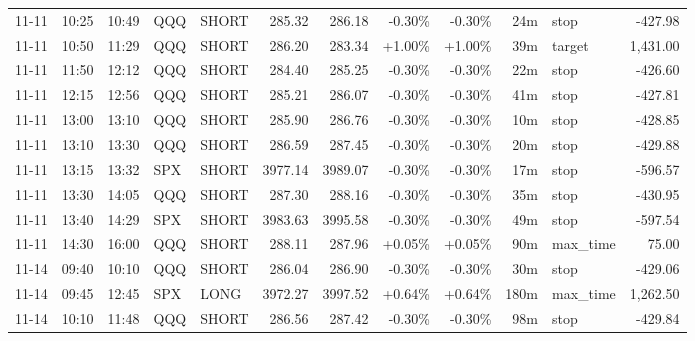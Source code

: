 \documentclass[11pt,a4paper,twoside]{article}
\begin{document}
\begin{center}
\begin{longtable}{>{\color{txtmain}}l l l l l r r r r r >{\color{txtmain}}l r}
11-11 & 10:25 & 10:49 & QQQ & SHORT & 285.32 & 286.18 & \textcolor{lossred}{-0.30\%} & \textcolor{lossred}{-0.30\%} & 24m & stop & \textcolor{lossred}{-427.98} \\
11-11 & 10:50 & 11:29 & QQQ & SHORT & 286.20 & 283.34 & \textcolor{wingreen}{+1.00\%} & \textcolor{wingreen}{+1.00\%} & 39m & target & \textcolor{wingreen}{1,431.00} \\
11-11 & 11:50 & 12:12 & QQQ & SHORT & 284.40 & 285.25 & \textcolor{lossred}{-0.30\%} & \textcolor{lossred}{-0.30\%} & 22m & stop & \textcolor{lossred}{-426.60} \\
11-11 & 12:15 & 12:56 & QQQ & SHORT & 285.21 & 286.07 & \textcolor{lossred}{-0.30\%} & \textcolor{lossred}{-0.30\%} & 41m & stop & \textcolor{lossred}{-427.81} \\
11-11 & 13:00 & 13:10 & QQQ & SHORT & 285.90 & 286.76 & \textcolor{lossred}{-0.30\%} & \textcolor{lossred}{-0.30\%} & 10m & stop & \textcolor{lossred}{-428.85} \\
11-11 & 13:10 & 13:30 & QQQ & SHORT & 286.59 & 287.45 & \textcolor{lossred}{-0.30\%} & \textcolor{lossred}{-0.30\%} & 20m & stop & \textcolor{lossred}{-429.88} \\
11-11 & 13:15 & 13:32 & SPX & SHORT & 3977.14 & 3989.07 & \textcolor{lossred}{-0.30\%} & \textcolor{lossred}{-0.30\%} & 17m & stop & \textcolor{lossred}{-596.57} \\
11-11 & 13:30 & 14:05 & QQQ & SHORT & 287.30 & 288.16 & \textcolor{lossred}{-0.30\%} & \textcolor{lossred}{-0.30\%} & 35m & stop & \textcolor{lossred}{-430.95} \\
11-11 & 13:40 & 14:29 & SPX & SHORT & 3983.63 & 3995.58 & \textcolor{lossred}{-0.30\%} & \textcolor{lossred}{-0.30\%} & 49m & stop & \textcolor{lossred}{-597.54} \\
11-11 & 14:30 & 16:00 & QQQ & SHORT & 288.11 & 287.96 & \textcolor{wingreen}{+0.05\%} & \textcolor{wingreen}{+0.05\%} & 90m & max\_time & \textcolor{wingreen}{75.00} \\
11-14 & 09:40 & 10:10 & QQQ & SHORT & 286.04 & 286.90 & \textcolor{lossred}{-0.30\%} & \textcolor{lossred}{-0.30\%} & 30m & stop & \textcolor{lossred}{-429.06} \\
11-14 & 09:45 & 12:45 & SPX & LONG & 3972.27 & 3997.52 & \textcolor{wingreen}{+0.64\%} & \textcolor{wingreen}{+0.64\%} & 180m & max\_time & \textcolor{wingreen}{1,262.50} \\
11-14 & 10:10 & 11:48 & QQQ & SHORT & 286.56 & 287.42 & \textcolor{lossred}{-0.30\%} & \textcolor{lossred}{-0.30\%} & 98m & stop & \textcolor{lossred}{-429.84} \\

\end{longtable}
\end{center}
\end{document}

